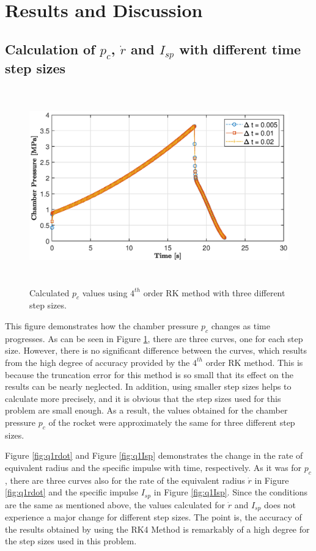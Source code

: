 \documentclass[letterpaper,12pt]{article}
\begin{document}
\newpage

\section{Results and Discussion}
\subsection{Calculation of $p_c$, $\dot{r}$ and $I_{sp}$ with different time step sizes}

\begin{figure} [ht]
	\centering
	\includegraphics[height = 8.5cm]{graphs/q1_pc.eps}
	\caption{Calculated $p_c$ values using $4^{th}$ order RK method with three different step sizes.}
     \label{fig:q1pc}
\end{figure}

This figure demonstrates how the chamber pressure $p_c$ changes as time progresses. As can be seen in 
Figure \ref{fig:q1pc}, there are three curves, one for each step size. However,
there is no significant difference between the curves, which results from the high degree of accuracy
provided by the $4^{th}$ order RK method. This is because the truncation error for this method is so
small that its effect on the results can be nearly neglected. In addition, using smaller step sizes
helps to calculate more precisely, and it is obvious that the step sizes used for this problem are small
enough. As a result, the values obtained for the chamber pressure $p_c$ of the rocket were approximately
the same for three different step sizes.

\vspace{1em}
Figure \ref{fig:q1rdot} and Figure \ref{fig:q1Isp} demonstrates the change in the rate of equivalent 
radius and the specific impulse with time, respectively.
As it was for $p_c$, there are three curves also for the rate of the equivalent radius
$\dot{r}$ in Figure \ref{fig:q1rdot} and the specific impulse $I_{sp}$ in Figure \ref{fig:q1Isp}. 
Since the conditions are the same as mentioned above, the values calculated for $\dot{r}$ and $I_{sp}$ does not 
experience a major change for different step sizes. The point is, the accuracy of the results obtained by using the RK4 Method
is remarkably of a high degree for the step sizes used in this problem.
\newpage
\end{document}
